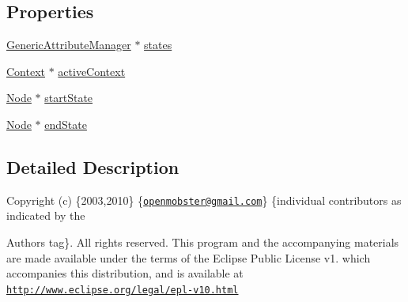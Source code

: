 \subsection*{\-Properties}
\begin{DoxyCompactItemize}
\item 
\hyperlink{interface_generic_attribute_manager}{\-Generic\-Attribute\-Manager} $\ast$ \hyperlink{interface_process_a19c15a1a025bc71b2402e86c43607321}{states}
\item 
\hyperlink{interface_context}{\-Context} $\ast$ \hyperlink{interface_process_aba0365db90cfa5758c64250c794c67e3}{active\-Context}
\item 
\hyperlink{interface_node}{\-Node} $\ast$ \hyperlink{interface_process_a947149552b6df6c25dd37a8ec5c947be}{start\-State}
\item 
\hyperlink{interface_node}{\-Node} $\ast$ \hyperlink{interface_process_a7b2577186857e729cad7d09d2b7ae7fe}{end\-State}
\end{DoxyCompactItemize}


\subsection{\-Detailed \-Description}
\-Copyright (c) \{2003,2010\} \{\href{mailto:openmobster@gmail.com}{\tt openmobster@gmail.\-com}\} \{individual contributors as indicated by the \begin{DoxyAuthor}{\-Authors}
tag\}. \-All rights reserved. \-This program and the accompanying materials are made available under the terms of the \-Eclipse \-Public \-License v1. which accompanies this distribution, and is available at \href{http://www.eclipse.org/legal/epl-v10.html}{\tt http\-://www.\-eclipse.\-org/legal/epl-\/v10.\-html} 
\end{DoxyAuthor}


